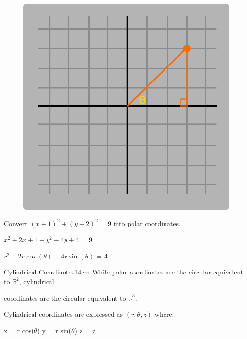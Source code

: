     \begin{figure}[h]
        \centering
        \includegraphics[scale=0.3]{Images/1.6.1.png}
    \end{figure}



    \begin{example}
        Convert $(x+1)^2 + (y-2)^2$ = 9 into polar coordinates.    
    \end{example}

    \begin{tbox}
        $x^2 + 2x + 1 + y^2 - 4y + 4$ = 9

        $r^2 + 2r\cos(\theta) - 4r\sin(\theta)$ = 4
    \end{tbox}

    \newpage



    \begin{definition}{Cylindrical Coordiantes}{14cm}
        While polar coordinates are the circular equivalent to $\mathbb{R}^2$,
        cylindrical
        
        coordinates are the circular equivalent to $\mathbb{R}^3$.
        
        {\color{lblue} Cylindrical coordinates} are expressed as
        $(r,\theta,z)$ where:

        \hspace{0.5cm}
        x = r cos($\theta$)
        \hspace{1cm}
        y = r sin($\theta$)
        \hspace{1cm}
        z = z
    \end{definition}

